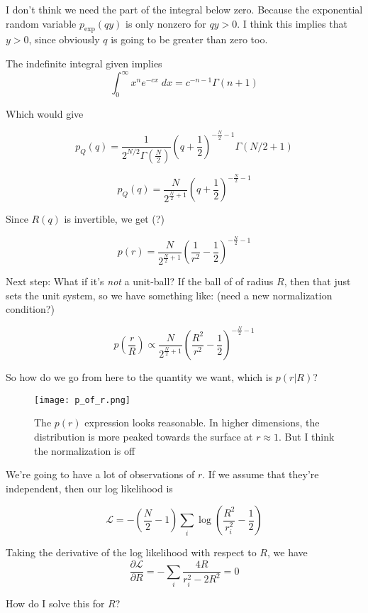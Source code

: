 \documentclass{article}
\begin{document}
I don't think we need the part of the integral below zero. Because the exponential random variable $p_\text{exp}(qy)$ is only nonzero for $qy > 0$. I think this implies that $y>0$, since obviously $q$ is going to be greater than zero too.

The indefinite integral given implies
$$
\int_{0}^{\infty} x^n e^{-cx} \; dx = c^{-n-1} \Gamma(n+1)
$$

Which would give

$$
p_Q(q) = \frac{1}{2^{N/2} \Gamma(\frac{N}{2})} \left(q + \frac{1}{2}\right)^{-\frac{N}{2} - 1} \Gamma(N/2+1)
$$

$$
p_Q(q) = \frac{N}{2^{\frac{N}{2} + 1}} \left(q + \frac{1}{2}\right)^{-\frac{N}{2} - 1} 
$$

Since $R(q)$ is invertible, we get (?)

$$
p(r) = \frac{N}{2^{\frac{N}{2} + 1}} \left(\frac{1}{r^2} - \frac{1}{2} \right)^{-\frac{N}{2} - 1}
$$

Next step: What if it's \emph{not} a unit-ball? If the ball of of radius $R$, then that just sets the unit system, so  we have something like: (need a new normalization condition?)

$$
p(\frac{r}{R}) \propto \frac{N}{2^{\frac{N}{2} + 1}} \left(\frac{R^2}{r^2} - \frac{1}{2} \right)^{-\frac{N}{2} - 1}
$$

So how do we go from here to the quantity we want, which is $p(r|R)$?

\begin{figure}[h]
\centering
\texttt{[image: p\_of\_r.png]}
\caption{The $p(r)$ expression looks reasonable. In higher dimensions, the distribution is more peaked towards the surface at $r \approx 1$. But I think the normalization is off}
\end{figure}

We're going to have a lot of observations of $r$. If we assume that they're independent, then our log likelihood is 

$$
\mathcal{L} = -\left( \frac{N}{2} - 1\right) \sum_i \log \left( \frac{R^2}{r_i^2} - \frac{1}{2} \right)
$$

Taking the derivative of the log likelihood with respect to $R$, we have
$$
\frac{\partial \mathcal{L}}{\partial R} = - \sum_i \frac{4R}{r_i^2 - 2R^2} = 0
$$

How do I solve this for $R$?
\end{document}
